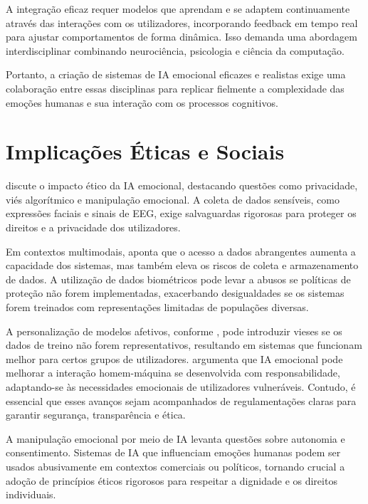 \documentclass[a4paper,12pt]{report}
\begin{document}
	A integração eficaz requer modelos que aprendam e se adaptem continuamente através das interações com os utilizadores, incorporando feedback em tempo real para ajustar comportamentos de forma dinâmica. Isso demanda uma abordagem interdisciplinar combinando neurociência, psicologia e ciência da computação.
	
	Portanto, a criação de sistemas de IA emocional eficazes e realistas exige uma colaboração entre essas disciplinas para replicar fielmente a complexidade das emoções humanas e sua interação com os processos cognitivos.
	
	
	
	
	\section{Implicações Éticas e Sociais}
	
	\textcite{mueller2020} discute o impacto ético da IA emocional, destacando questões como privacidade, viés algorítmico e manipulação emocional. A coleta de dados sensíveis, como expressões faciais e sinais de EEG, exige salvaguardas rigorosas para proteger os direitos e a privacidade dos utilizadores.
	
	Em contextos multimodais, \textcite{lee2024} aponta que o acesso a dados abrangentes aumenta a capacidade dos sistemas, mas também eleva os riscos de coleta e armazenamento de dados. A utilização de dados biométricos pode levar a abusos se políticas de proteção não forem implementadas, exacerbando desigualdades se os sistemas forem treinados com representações limitadas de populações diversas.
	
	A personalização de modelos afetivos, conforme \textcite{kargarandehkordi2024}, pode introduzir vieses se os dados de treino não forem representativos, resultando em sistemas que funcionam melhor para certos grupos de utilizadores. \textcite{picard1997} argumenta que IA emocional pode melhorar a interação homem-máquina se desenvolvida com responsabilidade, adaptando-se às necessidades emocionais de utilizadores vulneráveis. Contudo, é essencial que esses avanços sejam acompanhados de regulamentações claras para garantir segurança, transparência e ética.
	
	A manipulação emocional por meio de IA levanta questões sobre autonomia e consentimento. Sistemas de IA que influenciam emoções humanas podem ser usados abusivamente em contextos comerciais ou políticos, tornando crucial a adoção de princípios éticos rigorosos para respeitar a dignidade e os direitos individuais.
	
\end{document}

